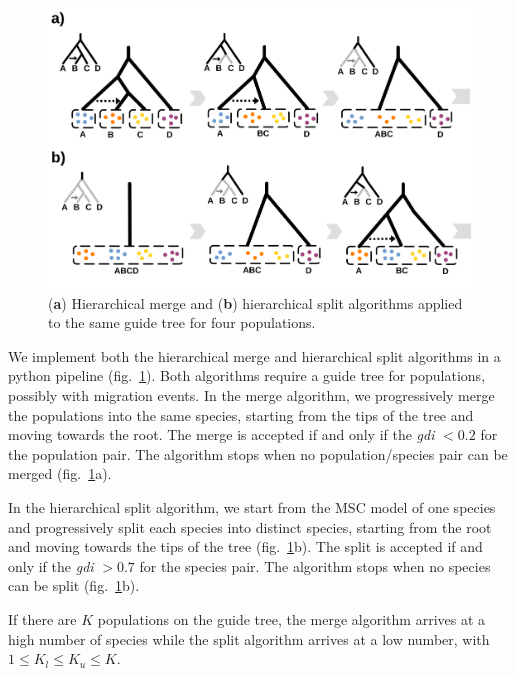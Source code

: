 \documentclass[A4]{article1}
\begin{document}
\begin{figure}
   \centering %
   \includegraphics[scale=0.25]{figs/Methods/HM_algo} %
   
   \caption{(\textbf{a}) Hierarchical merge and (\textbf{b}) hierarchical split
   algorithms applied to the same guide tree for four populations. \\%
	} 
	\label{fig:gdi-algorithms}
\end{figure}

We implement both the hierarchical merge and hierarchical split algorithms in a python
pipeline (fig.~\ref{fig:gdi-algorithms}).  Both algorithms require a guide tree for
populations, possibly with migration events.  In the merge algorithm, we progressively
merge the populations into the same species, starting from the tips of the tree and moving
towards the root.  The merge is accepted if and only if the \textit{gdi} $< 0.2$ for the
population pair.  The algorithm stops when no population/species pair can be merged
(fig.~\ref{fig:gdi-algorithms}a).

In the hierarchical split algorithm, we start from the MSC model of one species and
progressively split each species into distinct species, starting from the root and moving
towards the tips of the tree (fig.~\ref{fig:gdi-algorithms}b).  The split is accepted if and
only if the \textit{gdi} $> 0.7$ for the species pair.  The algorithm stops when no
species can be split (fig.~\ref{fig:gdi-algorithms}b).

If there are $K$ populations on the guide tree, the merge algorithm arrives at a high
number of species while the split algorithm arrives at a low number, with $1 \le K_l \le
K_u \le K $.
\end{document}
